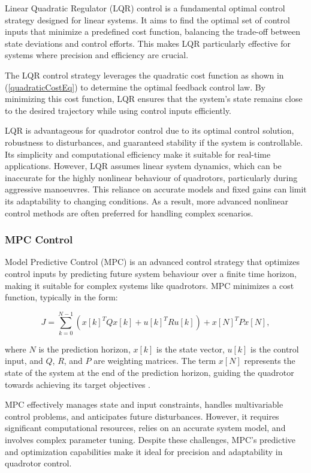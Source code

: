 \documentclass{UoNMCHA}
\numberwithin{equation}{section}
\begin{document}
Linear Quadratic Regulator (LQR) control is a fundamental optimal control strategy designed for linear systems. It aims to find the optimal set of control inputs that minimize a predefined cost function, balancing the trade-off between state deviations and control efforts. This makes LQR particularly effective for systems where precision and efficiency are crucial.

The LQR control strategy leverages the quadratic cost function as shown in (\ref{quadraticCostEq}) to determine the optimal feedback control law. By minimizing this cost function, LQR ensures that the system's state remains close to the desired trajectory while using control inputs efficiently. 


LQR is advantageous for quadrotor control due to its optimal control solution, robustness to disturbances, and guaranteed stability if the system is controllable. Its simplicity and computational efficiency make it suitable for real-time applications. However, LQR assumes linear system dynamics, which can be inaccurate for the highly nonlinear behaviour of quadrotors, particularly during aggressive manoeuvres. This reliance on accurate models and fixed gains can limit its adaptability to changing conditions. As a result, more advanced nonlinear control methods are often preferred for handling complex scenarios. \cite{website:LQR}


\subsubsection{MPC Control}

Model Predictive Control (MPC) is an advanced control strategy that optimizes control inputs by predicting future system behaviour over a finite time horizon, making it suitable for complex systems like quadrotors. MPC minimizes a cost function, typically in the form:

\begin{equation}
J = \sum_{k=0}^{N-1} \left( x[k]^T Q x[k] + u[k]^T R u[k] \right) + x[N]^T P x[N],
\end{equation}

where \( N \) is the prediction horizon, \( x[k] \) is the state vector, \( u[k] \) is the control input, and \( Q \), \( R \), and \( P \) are weighting matrices. The term \( x[N] \) represents the state of the system at the end of the prediction horizon, guiding the quadrotor towards achieving its target objectives \cite{MPC}.

MPC effectively manages state and input constraints, handles multivariable control problems, and anticipates future disturbances. However, it requires significant computational resources, relies on an accurate system model, and involves complex parameter tuning. Despite these challenges, MPC's predictive and optimization capabilities make it ideal for precision and adaptability in quadrotor control.
\end{document}
